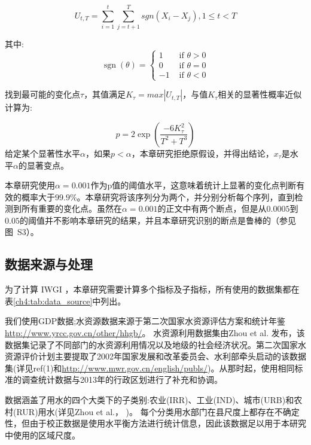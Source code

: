 \begin{equation}
    U_{t, T} = \sum_{i=1}^t\sum_{j=t+1}^T sgn(X_i - X_j), 1 \leq t < T
\end{equation}

其中:
\begin{equation}
    \operatorname{sgn}(\theta)= \begin{cases}1 & \text { if } \theta>0 \\ 0 & \text { if } \theta=0 \\ -1 & \text { if } \theta<0\end{cases}
\end{equation}

找到最可能的变化点$\tau$，其值满足$K_{\tau} = max|U_{t, T}|$，与值$K_{\tau}$相关的显著性概率近似计算为:

\begin{equation}
    p=2 \exp \left(\frac{-6 K_{\tau}^{2}}{T^{2}+T^{3}}\right)
\end{equation}
给定某个显著性水平$\alpha$，如果$p < \alpha$，本章研究拒绝原假设，并得出结论，$x_{\tau}$是水平$\alpha$的显著变点。

本章研究使用$\alpha = 0.001$作为p值的阈值水平，这意味着统计上显著的变化点判断有效的概率大于$99.9\%$。本章研究将该序列分为两个，并分别分析每个序列，直到检测到所有重要的变化点。虽然在$\alpha = 0.001$的正文中有两个断点，但是从$0.0005$到$0.05$的阈值并不影响本章研究的结果，并且本章研究识别的断点是鲁棒的（参见图~S3）。

\subsection{数据来源与处理}
为了计算 IWGI ，本章研究需要计算多个指标及子指标，所有使用的数据集都在表\ref{ch4:tab:data_source}中列出。



我们使用GDP数据;水资源数据来源于第二次国家水资源评估方案\cite{zhou2020}和统计年鉴\url{http://www.yrcc.gov.cn/other/hhgb/}。
水资源利用数据集由Zhou et al. \cite{zhou2020}发布，该数据集记录了不同部门的水资源利用情况以及地级的社会经济状况。第二次国家水资源评价计划主要提取了2002年国家发展和改革委员会、水利部牵头启动的该数据集(详见ref(1)和\url{http://www.mwr.gov.cn/english/publs/})。从那时起，使用相同标准的调查统计数据与2013年的行政区划进行了补充和协调。

数据涵盖了用水的四个大类下的子类别:农业(IRR)、工业(IND)、城市(URB)和农村(RUR)用水(详见Zhou et al.， \cite{zhou2020})。
每个分类用水部门在县尺度上都存在不确定性，但由于校正数据是使用水平衡方法进行统计信息，因此该数据足以用于本研究中使用的区域尺度。

